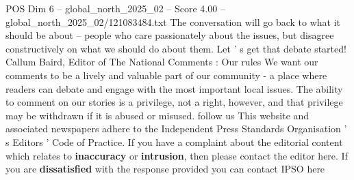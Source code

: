 \begin{textsample}{POS Dim 6 – global\_north\_2025\_02 – Score 4.00 – global\_north\_2025\_02/121083484.txt}
The conversation will go back to what it should be about -- people who care passionately about the issues, but disagree constructively on what we should do about them.
Let ' s get that debate started!
Callum Baird, Editor of The National Comments : Our rules We want our comments to be a lively and valuable part of our community - a place where readers can debate and engage with the most important local issues.
The ability to comment on our stories is a privilege, not a right, however, and that privilege may be withdrawn if it is abused or misused. follow us This website and associated newspapers adhere to the Independent Press Standards Organisation ' s Editors ' Code of Practice.
If you have a complaint about the editorial content which relates to \textbf{inaccuracy} or \textbf{intrusion}, then please contact the editor here.
If you are \textbf{dissatisfied} with the response provided you can contact IPSO here

\end{textsample}
